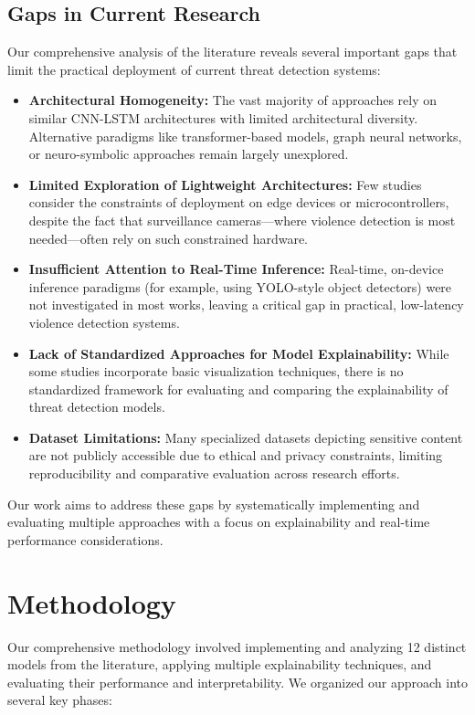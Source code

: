 \documentclass[conference,compsoc]{IEEEtran}
\begin{document}
\subsection{Gaps in Current Research}
Our comprehensive analysis of the literature reveals several important gaps that limit the practical deployment of current threat detection systems:

\begin{itemize}
    \item \textbf{Architectural Homogeneity:} The vast majority of approaches rely on similar CNN-LSTM architectures with limited architectural diversity. Alternative paradigms like transformer-based models, graph neural networks, or neuro-symbolic approaches remain largely unexplored.
    
    \item \textbf{Limited Exploration of Lightweight Architectures:} Few studies consider the constraints of deployment on edge devices or microcontrollers, despite the fact that surveillance cameras—where violence detection is most needed—often rely on such constrained hardware.
    
    \item \textbf{Insufficient Attention to Real-Time Inference:} Real-time, on-device inference paradigms (for example, using YOLO-style object detectors) were not investigated in most works, leaving a critical gap in practical, low-latency violence detection systems.
    
    \item \textbf{Lack of Standardized Approaches for Model Explainability:} While some studies incorporate basic visualization techniques, there is no standardized framework for evaluating and comparing the explainability of threat detection models.
    
    \item \textbf{Dataset Limitations:} Many specialized datasets depicting sensitive content are not publicly accessible due to ethical and privacy constraints, limiting reproducibility and comparative evaluation across research efforts.
\end{itemize}

Our work aims to address these gaps by systematically implementing and evaluating multiple approaches with a focus on explainability and real-time performance considerations.

\section{Methodology}
\FloatBarrier
Our comprehensive methodology involved implementing and analyzing 12 distinct models from the literature, applying multiple explainability techniques, and evaluating their performance and interpretability. We organized our approach into several key phases:
\end{document}
